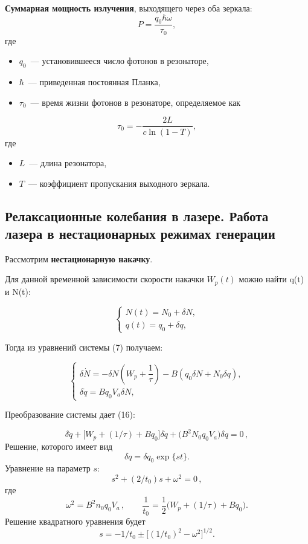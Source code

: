 \documentclass[12pt]{article}
\begin{document}
\newpage

\textbf{Суммарная мощность излучения}, выходящего через оба зеркала:
\[
P = \frac{q_0 \hbar \omega}{\tau_0},\tag{13}
\]
где
\begin{itemize}
    \item $q_0$~--- установившееся число фотонов в резонаторе,
    \item $\hbar$~--- приведенная постоянная Планка,
    \item $\tau_0$~--- время жизни фотонов в резонаторе, определяемое как
\end{itemize}
\[
\tau_0 = -\frac{2L}{c \ln(1 - T)},\tag{14}
\]
где
\begin{itemize}
    \item $L$~--- длина резонатора,
    \item $T$~--- коэффициент пропускания выходного зеркала.
\end{itemize}

\subsection{Релаксационные колебания в лазере. Работа лазера в нестационарных режимах генерации}

Рассмотрим \textbf{нестационарную накачку}.

\par

Для данной временной зависимости скорости накачки $W_{p}(t)$ можно найти q(t) и N(t):

\[\tag{15}
\begin{cases}
N(t) = N_0 + \delta N, \\
q(t) = q_0 + \delta q,
\end{cases}
\]

Тогда из уравнений системы (7) получаем:

\[\tag{16}
\begin{cases}
\delta\dot{N} = -\delta N \left( W_p + \dfrac{1}{\tau} \right) - B(q_0 \delta N + N_0 \delta q), \\[12pt]
\delta\dot{q} = B q_0 V_a \delta N,
\end{cases}
\]

Преобразование системы дает (16):

\[\tag{17}
\delta\ddot{q} + \bigl[W_p + (1/\tau) + B q_0\bigr] \delta\dot{q} + \bigl(B^2 N_0 q_0 V_a\bigr) \delta q = 0\,,
\]
Решение, которого имеет вид
\[
\delta q = \delta q_0 \exp\{st\}.\tag{18}
\]
Уравнение на параметр $s$:
\[
s^2 + (2/t_0)s + \omega^2 = 0\,,\tag{19}
\]
где
\[
\omega^2 = B^2 n_0 q_0 V_a\,, \qquad \frac{1}{t_0} = \frac{1}{2}\bigl(W_p + (1/\tau) + B q_0\bigr).
\]
Решение квадратного уравнения будет
\[
s = -1/t_0 \pm \bigl[(1/t_0)^2 - \omega^2\bigr]^{1/2}.\tag{20}
\]
\end{document}
